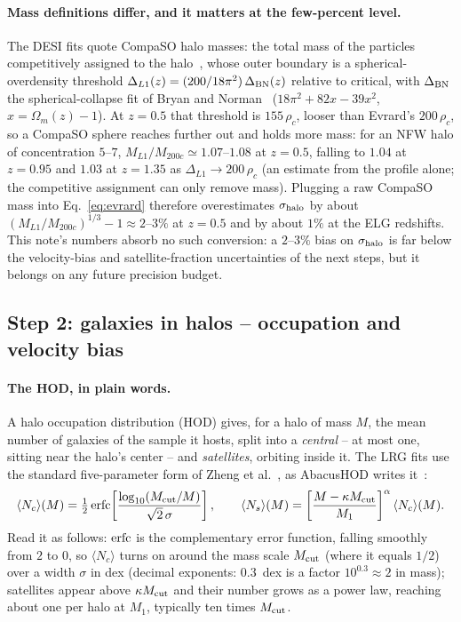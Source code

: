 \documentclass[11pt]{article}
\newcommand{\shalo}{\sigma_{\rm halo}}
\begin{document}
\paragraph{Mass definitions differ, and it matters at the few-percent
level.}
The DESI fits quote CompaSO halo masses: the total mass of the
particles competitively assigned to the halo~\cite{Rocher2023,
Hadzhiyska2022}, whose outer boundary is a spherical-overdensity
threshold $\Delta_{L1}(z) = (200/18\pi^2)\,\Delta_{\rm BN}(z)$ relative
to critical, with $\Delta_{\rm BN}$ the spherical-collapse fit of
Bryan and Norman~\cite{BryanNorman1998} ($18\pi^2 + 82x - 39x^2$,
$x = \Omega_m(z) - 1$).  At $z = 0.5$ that threshold is $155\,\rho_c$,
looser than Evrard's $200\,\rho_c$, so a CompaSO sphere reaches
further out and holds more mass: for an NFW halo of concentration
$5$--$7$, $M_{L1}/M_{200c} \simeq 1.07$--$1.08$ at $z = 0.5$, falling
to $1.04$ at $z = 0.95$ and $1.03$ at $z = 1.35$ as
$\Delta_{L1} \to 200\,\rho_c$ (an estimate from the profile alone; the
competitive assignment can only remove mass).  Plugging a raw CompaSO
mass into Eq.~\eqref{eq:evrard} therefore overestimates $\shalo$ by
about $(M_{L1}/M_{200c})^{1/3} - 1 \approx 2$--$3\%$ at $z = 0.5$ and
by about $1\%$ at the ELG redshifts.  This note's numbers absorb no
such conversion: a $2$--$3\%$ bias on $\shalo$ is far below the
velocity-bias and satellite-fraction uncertainties of the next steps,
but it belongs on any future precision budget.

\subsection{Step 2: galaxies in halos -- occupation and velocity bias}
\label{sec:hod}

\paragraph{The HOD, in plain words.}
A halo occupation distribution (HOD) gives, for a halo of mass $M$,
the mean number of galaxies of the sample it hosts, split into a
\emph{central} -- at most one, sitting near the halo's center -- and
\emph{satellites}, orbiting inside it.  The LRG fits use the standard
five-parameter form of Zheng et al.~\cite{Zheng2007}, as AbacusHOD
writes it~\cite{Yuan2022}:
\begin{equation}
  \langle N_c\rangle(M) = \tfrac{1}{2}\,{\rm erfc}\!\left[
    \frac{\log_{10}(M_{\rm cut}/M)}{\sqrt{2}\,\sigma}\right] ,
  \qquad
  \langle N_s\rangle(M) = \left[\frac{M - \kappa M_{\rm cut}}
    {M_1}\right]^{\alpha} \langle N_c\rangle(M) .
  \label{eq:zheng}
\end{equation}
Read it as follows: ${\rm erfc}$ is the complementary error function,
falling smoothly from $2$ to $0$, so $\langle N_c\rangle$ turns on
around the mass scale $M_{\rm cut}$ (where it equals $1/2$) over a
width $\sigma$ in dex (decimal exponents: $0.3$~dex is a factor
$10^{0.3} \approx 2$ in mass); satellites appear above $\kappa M_{\rm cut}$
and their number grows as a power law, reaching about one per halo at
$M_1$, typically ten times $M_{\rm cut}$.
\end{document}
